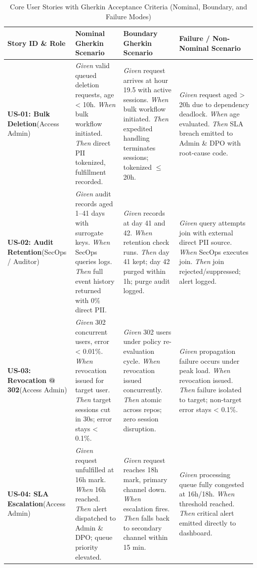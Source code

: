 \documentclass[10pt,a4paper]{article}
\begin{document}
\begin{table}[htbp]
\centering
\tiny
\begin{tabularx}{\textwidth}{|l|X|X|X|}
\hline
\textbf{Story ID \& Role} & \textbf{Nominal Gherkin Scenario} & \textbf{Boundary Gherkin Scenario} & \textbf{Failure / Non-Nominal Scenario} \\
\hline
\textbf{US-01: Bulk Deletion}\newline(Access Admin) & \textit{Given} valid queued deletion requests, age < 10h. \textit{When} bulk workflow initiated. \textit{Then} direct PII tokenized, fulfillment recorded. & \textit{Given} request arrives at hour 19.5 with active sessions. \textit{When} bulk workflow initiated. \textit{Then} expedited handling terminates sessions; tokenized $\leq$ 20h. & \textit{Given} request aged > 20h due to dependency deadlock. \textit{When} age evaluated. \textit{Then} SLA breach emitted to Admin \& DPO with root-cause code. \\
\hline
\textbf{US-02: Audit Retention}\newline(SecOps / Auditor) & \textit{Given} audit records aged 1--41 days with surrogate keys. \textit{When} SecOps queries logs. \textit{Then} full event history returned with 0\% direct PII. & \textit{Given} records at day 41 and 42. \textit{When} retention check runs. \textit{Then} day 41 kept; day 42 purged within 1h; purge audit logged. & \textit{Given} query attempts join with external direct PII source. \textit{When} SecOps executes join. \textit{Then} join rejected/suppressed; alert logged. \\
\hline
\textbf{US-03: Revocation @ 302}\newline(Access Admin) & \textit{Given} 302 concurrent users, error < 0.01\%. \textit{When} revocation issued for target user. \textit{Then} target sessions cut in 30s; error stays < 0.1\%. & \textit{Given} 302 users under policy re-evaluation cycle. \textit{When} revocation issued concurrently. \textit{Then} atomic across repos; zero session disruption. & \textit{Given} propagation failure occurs under peak load. \textit{When} revocation issued. \textit{Then} failure isolated to target; non-target error stays < 0.1\%. \\
\hline
\textbf{US-04: SLA Escalation}\newline(Access Admin) & \textit{Given} request unfulfilled at 16h mark. \textit{When} 16h reached. \textit{Then} alert dispatched to Admin \& DPO; queue priority elevated. & \textit{Given} request reaches 18h mark, primary channel down. \textit{When} escalation fires. \textit{Then} falls back to secondary channel within 15 min. & \textit{Given} processing queue fully congested at 16h/18h. \textit{When} threshold reached. \textit{Then} critical alert emitted directly to dashboard. \\
\hline
\end{tabularx}
\caption{Core User Stories with Gherkin Acceptance Criteria (Nominal, Boundary, and Failure Modes)}
\label{tab:user_stories_gherkin}
\end{table}
\end{document}
